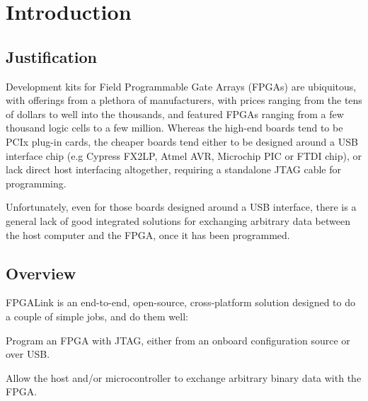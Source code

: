 



\vspace*{6cm}

\newpage
\tableofcontents

\newpage
\section{Introduction}
\subsection{Justification}
Development kits for Field Programmable Gate Arrays (FPGAs) are ubiquitous, with offerings from a plethora of manufacturers, with prices ranging from the tens of dollars to well into the thousands, and featured FPGAs ranging from a few thousand logic cells to a few million. Whereas the high-end boards tend to be PCIx plug-in cards, the cheaper boards tend either to be designed around a USB interface chip (e.g Cypress FX2LP, Atmel AVR, Microchip PIC or FTDI chip), or lack direct host interfacing altogether, requiring a standalone JTAG cable for programming.

Unfortunately, even for those boards designed around a USB interface, there is a general lack of good integrated solutions for exchanging arbitrary data between the host computer and the FPGA, once it has been programmed.

\subsection{Overview}
FPGALink is an end-to-end, open-source, cross-platform solution designed to do a couple of simple jobs, and do them well:

\begin{blobs}
  \item
    Program an FPGA with JTAG, either from an onboard configuration source or over USB.
  \item
    Allow the host and/or microcontroller to exchange arbitrary binary data with the FPGA.
\end{blobs}

